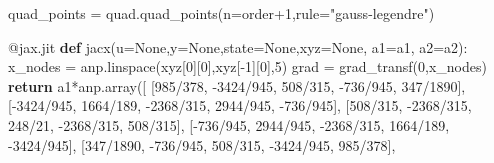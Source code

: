 \documentclass[
  11pt,
]{article}
\newenvironment{Shaded}{}{}
\newcommand{\AttributeTok}[1]{\textcolor[rgb]{0.49,0.56,0.16}{#1}}
\newcommand{\ControlFlowTok}[1]{\textcolor[rgb]{0.00,0.44,0.13}{\textbf{#1}}}
\newcommand{\DecValTok}[1]{\textcolor[rgb]{0.25,0.63,0.44}{#1}}
\newcommand{\KeywordTok}[1]{\textcolor[rgb]{0.00,0.44,0.13}{\textbf{#1}}}
\newcommand{\NormalTok}[1]{#1}
\newcommand{\OperatorTok}[1]{\textcolor[rgb]{0.40,0.40,0.40}{#1}}
\newcommand{\StringTok}[1]{\textcolor[rgb]{0.25,0.44,0.63}{#1}}
\newcommand{\VariableTok}[1]{\textcolor[rgb]{0.10,0.09,0.49}{#1}}
\begin{document}
\begin{Shaded}
\begin{Highlighting}[]
\NormalTok{    quad\_points }\OperatorTok{=}\NormalTok{ quad.quad\_points(n}\OperatorTok{=}\NormalTok{order}\OperatorTok{+}\DecValTok{1}\NormalTok{,rule}\OperatorTok{=}\StringTok{"gauss{-}legendre"}\NormalTok{)}

    \AttributeTok{@jax.jit}
    \KeywordTok{def}\NormalTok{ jacx(u}\OperatorTok{=}\VariableTok{None}\NormalTok{,y}\OperatorTok{=}\VariableTok{None}\NormalTok{,state}\OperatorTok{=}\VariableTok{None}\NormalTok{,xyz}\OperatorTok{=}\VariableTok{None}\NormalTok{, a1}\OperatorTok{=}\NormalTok{a1, a2}\OperatorTok{=}\NormalTok{a2):}
\NormalTok{        x\_nodes }\OperatorTok{=}\NormalTok{ anp.linspace(xyz[}\DecValTok{0}\NormalTok{][}\DecValTok{0}\NormalTok{],xyz[}\OperatorTok{{-}}\DecValTok{1}\NormalTok{][}\DecValTok{0}\NormalTok{],}\DecValTok{5}\NormalTok{)}
\NormalTok{        grad }\OperatorTok{=}\NormalTok{ grad\_transf(}\DecValTok{0}\NormalTok{,x\_nodes)}
        \ControlFlowTok{return}\NormalTok{ a1}\OperatorTok{*}\NormalTok{anp.array([}
\NormalTok{            [}\DecValTok{985}\OperatorTok{/}\DecValTok{378}\NormalTok{, }\OperatorTok{{-}}\DecValTok{3424}\OperatorTok{/}\DecValTok{945}\NormalTok{, }\DecValTok{508}\OperatorTok{/}\DecValTok{315}\NormalTok{, }\OperatorTok{{-}}\DecValTok{736}\OperatorTok{/}\DecValTok{945}\NormalTok{, }\DecValTok{347}\OperatorTok{/}\DecValTok{1890}\NormalTok{],}
\NormalTok{            [}\OperatorTok{{-}}\DecValTok{3424}\OperatorTok{/}\DecValTok{945}\NormalTok{, }\DecValTok{1664}\OperatorTok{/}\DecValTok{189}\NormalTok{, }\OperatorTok{{-}}\DecValTok{2368}\OperatorTok{/}\DecValTok{315}\NormalTok{, }\DecValTok{2944}\OperatorTok{/}\DecValTok{945}\NormalTok{, }\OperatorTok{{-}}\DecValTok{736}\OperatorTok{/}\DecValTok{945}\NormalTok{],}
\NormalTok{            [}\DecValTok{508}\OperatorTok{/}\DecValTok{315}\NormalTok{, }\OperatorTok{{-}}\DecValTok{2368}\OperatorTok{/}\DecValTok{315}\NormalTok{, }\DecValTok{248}\OperatorTok{/}\DecValTok{21}\NormalTok{, }\OperatorTok{{-}}\DecValTok{2368}\OperatorTok{/}\DecValTok{315}\NormalTok{, }\DecValTok{508}\OperatorTok{/}\DecValTok{315}\NormalTok{],}
\NormalTok{            [}\OperatorTok{{-}}\DecValTok{736}\OperatorTok{/}\DecValTok{945}\NormalTok{, }\DecValTok{2944}\OperatorTok{/}\DecValTok{945}\NormalTok{, }\OperatorTok{{-}}\DecValTok{2368}\OperatorTok{/}\DecValTok{315}\NormalTok{, }\DecValTok{1664}\OperatorTok{/}\DecValTok{189}\NormalTok{, }\OperatorTok{{-}}\DecValTok{3424}\OperatorTok{/}\DecValTok{945}\NormalTok{],}
\NormalTok{            [}\DecValTok{347}\OperatorTok{/}\DecValTok{1890}\NormalTok{, }\OperatorTok{{-}}\DecValTok{736}\OperatorTok{/}\DecValTok{945}\NormalTok{, }\DecValTok{508}\OperatorTok{/}\DecValTok{315}\NormalTok{, }\OperatorTok{{-}}\DecValTok{3424}\OperatorTok{/}\DecValTok{945}\NormalTok{, }\DecValTok{985}\OperatorTok{/}\DecValTok{378}\NormalTok{],}

\end{Highlighting}
\end{Shaded}
\end{document}
